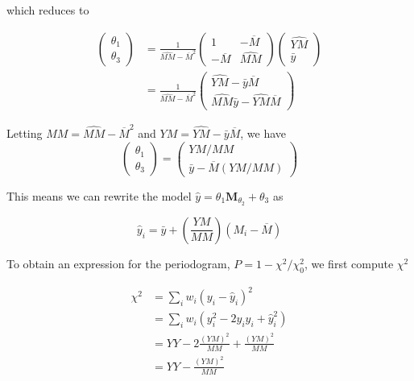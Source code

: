 \documentclass[apj]{emulateapj}
\newcommand{\Mshft}{\mathbf{M}_{\theta_2}}
\newcommand{\MMhat}{\widehat{MM}}
\newcommand{\YMhat}{\widehat{YM}}
\newcommand{\Mbar}{\overline{M}}
\begin{document}
which reduces to

\begin{align}
\begin{pmatrix} \theta_1 \\ \theta_3 \end{pmatrix}
&=
\frac{1}{\MMhat - \Mbar^2}
\begin{pmatrix} 1 & -\Mbar \\ -\Mbar & \MMhat \end{pmatrix}
\begin{pmatrix} \YMhat \\ \bar{y}\end{pmatrix}\\
&=
\frac{1}{\MMhat - \Mbar^2}
\begin{pmatrix} \YMhat - \bar{y}\Mbar \\ \MMhat\bar{y} - \YMhat\Mbar \end{pmatrix}
\end{align}

Letting $MM = \MMhat - \Mbar^2$ and $YM = \YMhat - \bar{y}\Mbar$, we have
\begin{equation}
\begin{pmatrix} \theta_1 \\ \theta_3 \end{pmatrix}
=
\begin{pmatrix} YM / MM \\ \bar{y} - \Mbar (YM / MM)\end{pmatrix}
\end{equation}

This means we can rewrite the model $\hat{y} = \theta_1\Mshft + \theta_3$ as

\begin{equation}
\hat{y}_i = \bar{y} + \left(\frac{YM}{MM}\right)(M_i - \Mbar)
\end{equation}

To obtain an expression for the periodogram, $P = 1 - \chi^2 / \chi^2_0$, we first compute $\chi^2$

\begin{align}
\chi^2 &= \sum_i w_i (y_i - \hat{y}_i)^2 \\
       &= \sum_i w_i (y_i^2 - 2y_i\hat{y}_i + \hat{y}_i^2)\\
       &= YY - 2\frac{(YM)^2}{MM} + \frac{(YM)^2}{MM}\\
       &= YY - \frac{(YM)^2}{MM}
\end{align}
\end{document}
